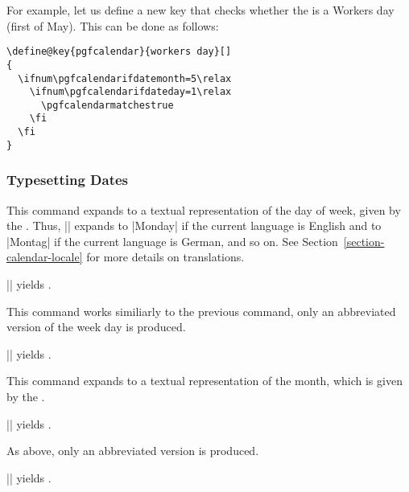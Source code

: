 \begin{command}{\pgfcalendarifdate{}}
  For example, let us define a new key that checks whether the
   is a Workers day (first of May). This can be done as
  follows:
\begin{verbatim}
\define@key{pgfcalendar}{workers day}[]
{
  \ifnum\pgfcalendarifdatemonth=5\relax
    \ifnum\pgfcalendarifdateday=1\relax
      \pgfcalendarmatchestrue
    \fi
  \fi
}
\end{verbatim}
\end{command}


\subsubsection{Typesetting Dates}




\begin{command}{\pgfcalendarweekdayname{}}
  This command expands to a textual representation of the day of week,
  given by the . Thus,
  || expands to |Monday| if the current
  language is English and to |Montag| if the current language is
  German, and so on. See Section~\ref{section-calendar-locale} for
  more details on translations.

  \example || yields
  \texttt{}. 
\end{command}


\begin{command}{\pgfcalendarweekdayshortname{}}
  This command works similiarly to the previous command, only an
  abbreviated version of the week day is produced.

  \example || yields
  \texttt{}. 
\end{command}


\begin{command}{\pgfcalendarmonthname{}}
  This command expands to a textual representation of the month, which
  is given by the .

  \example || yields
  \texttt{}. 
\end{command}


\begin{command}{\pgfcalendarmonthshortname{}}
  As above, only an abbreviated version is produced.

  \example || yields
  \texttt{}.   
\end{command}



